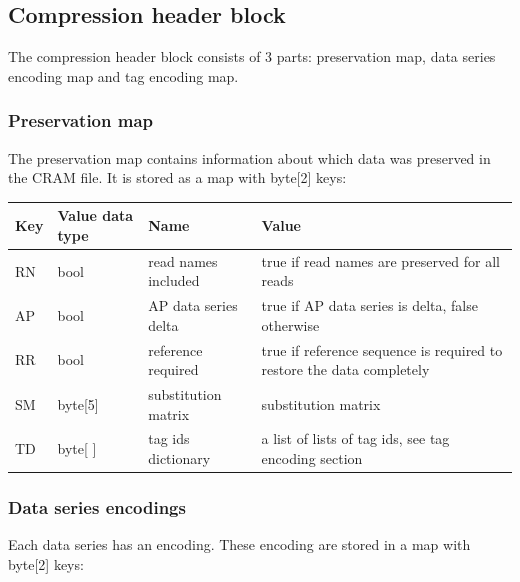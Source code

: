 \documentclass[a4paper]{article}
\begin{document}
\subsection{\textbf{Compression header block}}

The compression header block consists of 3 parts: preservation map, data series 
encoding map and tag encoding map.

\subsubsection*{Preservation map}

The preservation map contains information about which data was preserved in the 
CRAM file. It is stored as a map with byte[2] keys:

\begin{tabular}{|l|l|>{\raggedright}p{100pt}|>{\raggedright}p{220pt}|}
\hline
\textbf{Key} & \textbf{Value data type} & \textbf{Name} & \textbf{Value}\tabularnewline
\hline
RN & bool & read names included & true if read names are preserved for all reads\tabularnewline
\hline
AP & bool & AP data series delta & true if AP data series is delta, false otherwise\tabularnewline
\hline
RR & bool & reference required & true if reference sequence is required to restore 
the data completely\tabularnewline
\hline
SM & byte[5] & substitution matrix & substitution matrix\tabularnewline
\hline
TD & byte[ ] & tag ids dictionary & a list of lists of tag ids, see tag encoding 
section\tabularnewline
\hline
\end{tabular}

\subsubsection*{Data series encodings}

Each data series has an encoding. These encoding are stored in a map with byte[2] 
keys:
\end{document}
